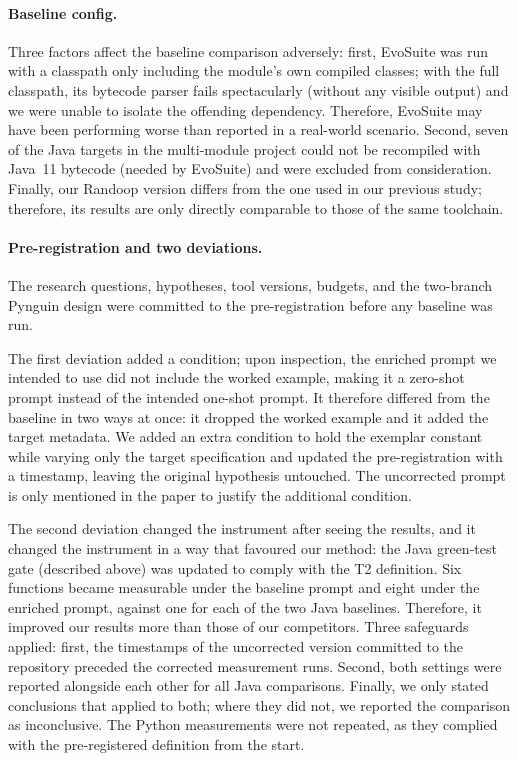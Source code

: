 \paragraph{Baseline config.}
Three factors affect the baseline comparison adversely: first, EvoSuite was run with a classpath
only including the module's own compiled classes; with the full classpath, its bytecode parser
fails spectacularly (without any visible output) and we were unable to isolate the offending
dependency. Therefore, EvoSuite may have been performing worse than reported in a real-world
scenario. Second, seven of the Java targets in the multi-module project could not be recompiled
with Java~11 bytecode (needed by EvoSuite) and were excluded from consideration. Finally, our
Randoop version differs from the one used in our previous study; therefore, its results are only
directly comparable to those of the same toolchain.

\paragraph{Pre-registration and two deviations.}
The research questions, hypotheses, tool versions, budgets, and the two-branch Pynguin design
were committed to the pre-registration before any baseline was run.

The first deviation added a condition; upon inspection, the enriched prompt we intended to use
did not include the worked example, making it a zero-shot prompt instead of the intended
one-shot prompt. It therefore differed from the baseline in two ways at once: it dropped the
worked example and it added the target metadata. We added an extra condition to hold the
exemplar constant while varying only the target specification and updated the pre-registration
with a timestamp, leaving the original hypothesis untouched. The uncorrected prompt is only
mentioned in the paper to justify the additional condition.

The second deviation changed the instrument after seeing the results, and it changed the
instrument in a way that favoured our method: the Java green-test gate (described above) was
updated to comply with the T2 definition. Six functions became measurable under the baseline
prompt and eight under the enriched prompt, against one for each of the two Java baselines.
Therefore, it improved our results more than those of our competitors. Three safeguards applied:
first, the timestamps of the uncorrected version committed to the repository preceded the
corrected measurement runs. Second, both settings were reported alongside each other for all
Java comparisons. Finally, we only stated conclusions that applied to both; where they did not,
we reported the comparison as inconclusive. The Python measurements were not repeated, as they
complied with the pre-registered definition from the start.
